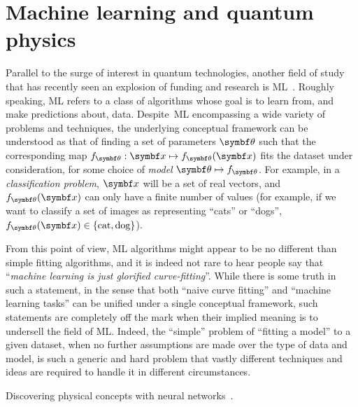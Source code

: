 \section{Machine learning and quantum physics}
\label{sec:intro:ML}

Parallel to the surge of interest in quantum technologies, another field of study that has recently seen an explosion of funding and research is \ac{ML}~\cite{friedman2001elements,you2011atomic,bishop2006pattern,abu2012learning,murphy2012machine,mehta2019highbias}.
Roughly speaking, \ac{ML} refers to a class of algorithms whose goal is to learn from, and make predictions about, data.
Despite~\ac{ML} encompassing a wide variety of problems and techniques, the underlying conceptual framework can be understood as that of finding a set of parameters $\bstheta$ such that the corresponding map $f_\bstheta:\bs x\mapsto f_\bstheta(\bs x)$ fits the dataset under consideration, for some choice of \emph{model} $\bstheta\mapsto f_\bstheta$.
For example, in a \emph{classification problem}, $\bs x$ will be a set of real vectors, and $f_\bstheta(\bs x)$ can only have a finite number of values (for example, if we want to classify a set of images as representing ``cats'' or ``dogs'', $f_\bstheta(\bs x)\in\{\text{cat},\text{dog}\}$).

From this point of view, \ac{ML} algorithms might appear to be no different than simple fitting algorithms, and it is indeed not rare to hear people say that ``\emph{machine learning is just glorified curve-fitting}''. While there is some truth in such a statement, in the sense that both ``naive curve fitting'' and ``machine learning tasks'' can be unified under a single conceptual framework, such statements are completely off the mark when their implied meaning is to undersell the field of \ac{ML}.
Indeed, the ``simple'' problem of ``fitting a model'' to a given dataset, when no further assumptions are made over the type of data and model, is such a generic and hard problem that vastly different techniques and ideas are required to handle it in different circumstances.


\cite{carleo2019machine}
Discovering physical concepts with neural networks~\cite{iten2020discovering}.

